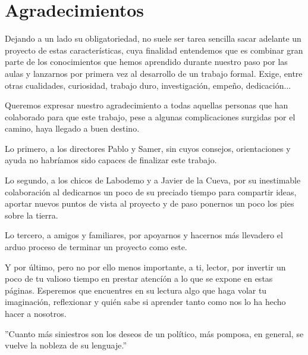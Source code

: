 
\newpage
\thispagestyle{empty}

\chapter*{Agradecimientos}

Dejando a un lado su obligatoriedad, no suele ser tarea sencilla sacar adelante un proyecto de estas características, cuya finalidad entendemos que es combinar gran parte de los conocimientos que hemos aprendido durante nuestro paso por las aulas y lanzarnos por primera vez al desarrollo de un trabajo formal. Exige, entre otras cualidades, curiosidad, trabajo duro, investigación, empeño, dedicación...

Queremos expresar nuestro agradecimiento a todas aquellas personas que han colaborado para que este trabajo, pese a algunas complicaciones surgidas por el camino, haya llegado a buen destino.

Lo primero, a los directores Pablo y Samer, sin cuyos consejos, orientaciones y ayuda no habríamos sido capaces de finalizar este trabajo.

Lo segundo, a los chicos de Labodemo y a Javier de la Cueva, por su inestimable colaboración al dedicarnos un poco de su preciado tiempo para compartir ideas, aportar nuevos puntos de vista al proyecto y de paso ponernos un poco los pies sobre la tierra.

Lo tercero, a amigos y familiares, por apoyarnos y hacernos más llevadero el arduo proceso de terminar un proyecto como este.

Y por último, pero no por ello menos importante, a ti, lector, por invertir un poco de tu valioso tiempo en prestar atencíón a lo que se expone en estas páginas.  Esperemos que encuentres en su lectura algo que haga volar tu imaginación, reflexionar y quién sabe si aprender tanto como nos lo ha hecho hacer a nosotros.

\vfill

''Cuanto más siniestros son los deseos de un político, más pomposa, en general, se vuelve la nobleza de su lenguaje.''



\newpage
\tableofcontents
\newpage
\setcounter{page}{7}
{\listoffigures \let\cleardoublepage\relax \listoftables}
\newpage
